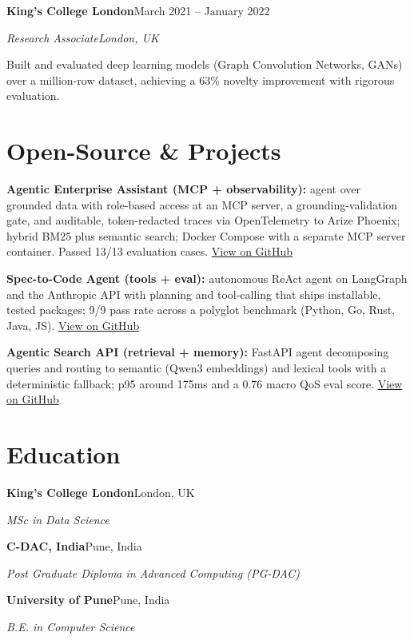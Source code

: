 \documentclass[10pt,a4paper]{article}
\newcommand{\entry}[4]{%
  {\color{company}\bfseries #1}\hfill {\color{muted}#2}\par
  \vspace{1pt}
  {\itshape #3}\hfill {\color{muted}\itshape #4}\par
  \vspace{3pt}%
}
\begin{document}
\entry{King's College London}{March 2021 -- January 2022}{Research Associate}{London, UK}
\begin{tight}
  \item Built and evaluated deep learning models (Graph Convolution Networks, GANs) over a million-row dataset, achieving a 63\% novelty improvement with rigorous evaluation.
\end{tight}

\section{Open-Source \& Projects}
\begin{tight}
  \item \textbf{Agentic Enterprise Assistant (MCP + observability):} agent over grounded data with role-based access at an MCP server, a grounding-validation gate, and auditable, token-redacted traces via OpenTelemetry to Arize Phoenix; hybrid BM25 plus semantic search; Docker Compose with a separate MCP server container. Passed 13/13 evaluation cases. \href{https://github.com/abhijeetscode/Agentic-Enterprise-Assistant}{View on GitHub}
  \item \textbf{Spec-to-Code Agent (tools + eval):} autonomous ReAct agent on LangGraph and the Anthropic API with planning and tool-calling that ships installable, tested packages; 9/9 pass rate across a polyglot benchmark (Python, Go, Rust, Java, JS). \href{https://github.com/abhijeetscode/Spec-to-Code-Agent}{View on GitHub}
  \item \textbf{Agentic Search API (retrieval + memory):} FastAPI agent decomposing queries and routing to semantic (Qwen3 embeddings) and lexical tools with a deterministic fallback; p95 around 175ms and a 0.76 macro QoS eval score. \href{https://github.com/abhijeetscode/search-agent}{View on GitHub}
\end{tight}

\section{Education}
{\color{company}\bfseries King's College London}\hfill {\color{muted}London, UK}\par
{\itshape MSc in Data Science}\par\vspace{2pt}
{\color{company}\bfseries C-DAC, India}\hfill {\color{muted}Pune, India}\par
{\itshape Post Graduate Diploma in Advanced Computing (PG-DAC)}\par\vspace{2pt}
{\color{company}\bfseries University of Pune}\hfill {\color{muted}Pune, India}\par
{\itshape B.E. in Computer Science}\par
\end{document}
